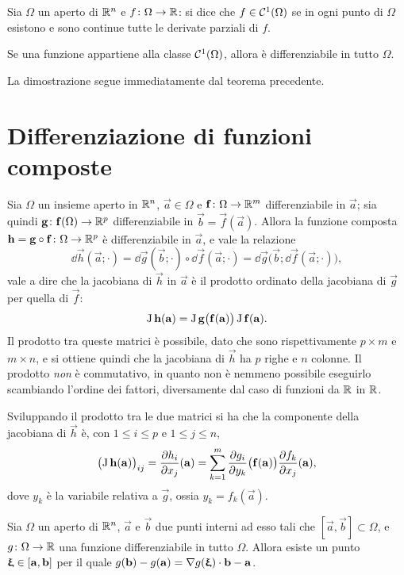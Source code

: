 \begin{definizione}
Sia $\Omega$ un aperto di $\mathbb{R}^n$ e $f\colon\Omega\to\mathbb{R}$: si dice che $f\in\mathcal{C}^{{1}}(\Omega)$ se in ogni punto di $\Omega$ esistono e sono continue tutte le derivate parziali di $f$.
\end{definizione}
\begin{corollario}
Se una funzione appartiene alla classe $\mathcal{C}^{{1}}(\Omega)$, allora è differenziabile in tutto $\Omega$.
\end{corollario}
La dimostrazione segue immediatamente dal teorema precedente.

\section{Differenziazione di funzioni composte}
\begin{teorema}
	Sia $\Omega$ un insieme aperto in $\mathbb{R}^n$, $\vec a\in\Omega$ e $\mathbf{f}\colon\Omega\to\mathbb{R}^m$ differenziabile in $\vec a$; sia quindi $\mathbf{g}\colon\mathbf{f}(\Omega)\to\mathbb{R}^p$ differenziabile in $\vec b=\vec f(\vec a)$.
	Allora la funzione composta $\mathbf{h}=\mathbf{g}\circ\mathbf{f}\colon\Omega\to\mathbb{R}^p$ è differenziabile in $\vec a$, e vale la relazione
	\begin{equation} \label{eq:composizione_differenziali}
		\dd\vec h(\vec a;\cdot)=\dd\vec g(\vec b;\cdot)\circ\dd\vec f(\vec a;\cdot)=\dd\vec g\big(\vec b;\dd\vec f(\vec a;\cdot)\big),
	\end{equation}
	vale a dire che la jacobiana di $\vec h$ in $\vec a$ è il prodotto ordinato della jacobiana di $\vec g$ per quella di $\vec f$:
	\begin{equation}
		\operatorname{J}\mathbf{h}(\mathbf{a})=\operatorname{J}\mathbf{g}\big(\mathbf{f}(\mathbf{a})\big)\operatorname{J}\mathbf{f}(\mathbf{a}).
	\end{equation}
	Il prodotto tra queste matrici è possibile, dato che sono rispettivamente $p\times m$ e $m\times n$, e si ottiene quindi che la jacobiana di $\vec h$ ha $p$ righe e $n$ colonne. Il prodotto \emph{non} è commutativo, in quanto non è nemmeno possibile eseguirlo scambiando l'ordine dei fattori, diversamente dal caso di funzioni da $\mathbb{R}$ in $\mathbb{R}$.
\end{teorema}
Sviluppando il prodotto tra le due matrici si ha che la componente della jacobiana di $\vec h$ è, con $1\leq i\leq p$ e $1\leq j\leq n$,
\[
\big(\!\operatorname{J}\mathbf{h}(\mathbf{a})\big)_{ij}=\frac{\partial {h_i}}{\partial {x_j}}(\mathbf{a})=\sum_{k=1}^m\frac{\partial {g_i}}{\partial {y_k}}\big(\mathbf{f}(\mathbf{a})\big)\frac{\partial {f_k}}{\partial {x_j}}(\mathbf{a}),
\]
dove $y_k$ è la variabile relativa a $\vec g$, ossia $y_k=f_k(\vec a)$.
\begin{teorema}[di Lagrange] \label{t:lagrange_piu_variabili}
Sia $\Omega$ un aperto di $\mathbb{R}^n$, $\vec a$ e $\vec b$ due punti interni ad esso tali che $[\vec a,\vec b]\subset\Omega$, e $g\colon\Omega\to\mathbb{R}$ una funzione differenziabile in tutto $\Omega$. Allora esiste un punto $\bm{\upxi}\in[\mathbf{a},\mathbf{b}]$ per il quale $g(\mathbf{b})-g(\mathbf{a})={\nabla g(\bm{\upxi})}\cdot{\mathbf{b}-\mathbf{a}}$.
\end{teorema}

